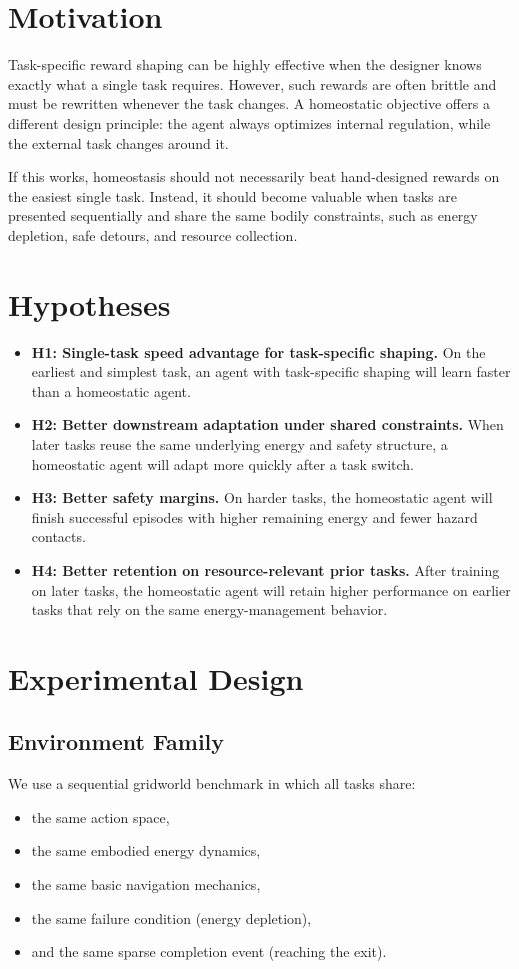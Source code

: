 \documentclass[11pt]{article}
\begin{document}
\section{Motivation}
Task-specific reward shaping can be highly effective when the designer knows exactly what a single task requires. However, such rewards are often brittle and must be rewritten whenever the task changes. A homeostatic objective offers a different design principle: the agent always optimizes internal regulation, while the external task changes around it.

If this works, homeostasis should not necessarily beat hand-designed rewards on the easiest single task. Instead, it should become valuable when tasks are presented sequentially and share the same bodily constraints, such as energy depletion, safe detours, and resource collection.

\section{Hypotheses}
\begin{itemize}[leftmargin=1.5em]
    \item \textbf{H1: Single-task speed advantage for task-specific shaping.} On the earliest and simplest task, an agent with task-specific shaping will learn faster than a homeostatic agent.
    \item \textbf{H2: Better downstream adaptation under shared constraints.} When later tasks reuse the same underlying energy and safety structure, a homeostatic agent will adapt more quickly after a task switch.
    \item \textbf{H3: Better safety margins.} On harder tasks, the homeostatic agent will finish successful episodes with higher remaining energy and fewer hazard contacts.
    \item \textbf{H4: Better retention on resource-relevant prior tasks.} After training on later tasks, the homeostatic agent will retain higher performance on earlier tasks that rely on the same energy-management behavior.
\end{itemize}

\section{Experimental Design}
\subsection{Environment Family}
We use a sequential gridworld benchmark in which all tasks share:
\begin{itemize}[leftmargin=1.5em]
    \item the same action space,
    \item the same embodied energy dynamics,
    \item the same basic navigation mechanics,
    \item the same failure condition (energy depletion),
    \item and the same sparse completion event (reaching the exit).
\end{itemize}
\end{document}
